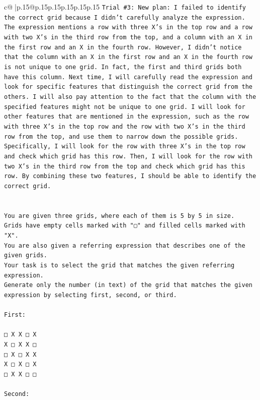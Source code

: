 \documentclass{article}
\begin{document}
{\begin{supertabular}{c@{$\;$}|p{.15\linewidth}@{}p{.15\linewidth}p{.15\linewidth}p{.15\linewidth}p{.15\linewidth}p{.15\linewidth}}
{{{\texttt{Trial \#3: New plan: I failed to identify the correct grid because I didn't carefully analyze the expression. The expression mentions a row with three X's in the top row and a row with two X's in the third row from the top, and a column with an X in the first row and an X in the fourth row. However, I didn't notice that the column with an X in the first row and an X in the fourth row is not unique to one grid. In fact, the first and third grids both have this column. Next time, I will carefully read the expression and look for specific features that distinguish the correct grid from the others. I will also pay attention to the fact that the column with the specified features might not be unique to one grid. I will look for other features that are mentioned in the expression, such as the row with three X's in the top row and the row with two X's in the third row from the top, and use them to narrow down the possible grids. Specifically, I will look for the row with three X's in the top row and check which grid has this row. Then, I will look for the row with two X's in the third row from the top and check which grid has this row. By combining these two features, I should be able to identify the correct grid.} \\
\\ 
\\ 
\texttt{You are given three grids, where each of them is 5 by 5 in size.} \\
\texttt{Grids have empty cells marked with "▢" and filled cells marked with "X".} \\
\texttt{You are also given a referring expression that describes one of the given grids.} \\
\texttt{Your task is to select the grid that matches the given referring expression.} \\
\texttt{Generate only the number (in text) of the grid that matches the given expression by selecting first, second, or third.} \\
\\ 
\texttt{First:} \\
\\ 
\texttt{□ X X □ X} \\
\texttt{X □ X X □} \\
\texttt{□ X □ X X} \\
\texttt{X □ X □ X} \\
\texttt{□ X X □ □} \\
\\ 
\texttt{Second:} \\
}}}
\end{supertabular}}
\end{document}
